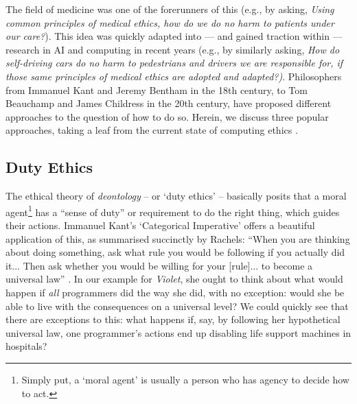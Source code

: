 \documentclass[journal,twocolumn]{IEEEtran}
\begin{document}
The field of medicine was one of the forerunners of this (e.g., by asking, \textit{Using common principles of medical ethics, how do we do no harm to patients under our care?}). This idea was quickly adapted into --- and gained traction within --- research in AI and computing in recent years (e.g., by similarly asking, \textit{How do self-driving cars do no harm to pedestrians and drivers we are responsible for, if those same principles of medical ethics are adopted and adapted?)}. 
Philosophers from Immanuel Kant and Jeremy Bentham in the 18th century, to Tom Beauchamp and James Childress in the 20th century, have proposed different approaches to the question of how to do so. Herein, we discuss three popular approaches, taking a leaf from the current state of computing ethics \cite{Zoshak2021}.




\subsection{Duty Ethics}
The ethical theory of \textit{deontology} -- or `duty ethics' -- basically posits that a moral agent\footnote{Simply put, a `moral agent' is usually a person who has agency to decide how to act.} has a ``sense of duty'' or requirement to do the right thing, which guides their actions. Immanuel Kant's `Categorical Imperative' offers a beautiful application of this, as summarised succinctly by Rachels: ``When you are thinking about doing something, ask what rule you would be following if you actually did it... Then ask whether you would be willing for your [rule]... to become a universal law'' \cite{Rachels2015}. In our example for \textit{Violet}, she ought to think about what would happen if \textit{all} programmers did the way she did, with no exception: would she be able to live with the consequences on a universal level? We could quickly see that there are exceptions to this: what happens if, say, by following her hypothetical universal law, one programmer's actions end up disabling life support machines in hospitals?
\end{document}
